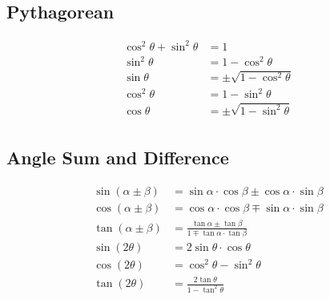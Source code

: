 \documentclass{report}
\theoremstyle{mytheoremstyle}
\theoremstyle{mytheoremstyle}
\theoremstyle{myproblemstyle}
\begin{document}
    \subsection{Pythagorean}
    \begin{align}
        \cos^2\theta+\sin^2\theta &= 1 \\
        \sin^2\theta &= 1 - \cos^2 \theta \\
        \sin\theta &= \pm\sqrt{1 - \cos^2 \theta} \\
        \cos^2\theta &= 1 - \sin^2 \theta \\
        \cos\theta &= \pm\sqrt{1 - \sin^2 \theta} \\
    \end{align}
    \subsection{Angle Sum and Difference}
    \begin{align}
        \sin(\alpha \pm \beta) &= \sin\alpha\cdot\cos\beta \pm \cos\alpha\cdot\sin\beta \\
        \cos(\alpha \pm \beta) &= \cos\alpha\cdot\cos\beta \mp \sin\alpha\cdot\sin\beta \\
        \tan(\alpha \pm \beta) &= \frac{\tan\alpha \pm \tan\beta}{1 \mp \tan\alpha\cdot\tan\beta} \\
        \sin(2\theta) &= 2\sin\theta\cdot\cos\theta \\
        \cos(2\theta) &= \cos^2\theta - \sin^2\theta \\
        \tan(2\theta) &= \frac{2\tan\theta}{1 - \tan^2\theta}
    \end{align}
\end{document}
